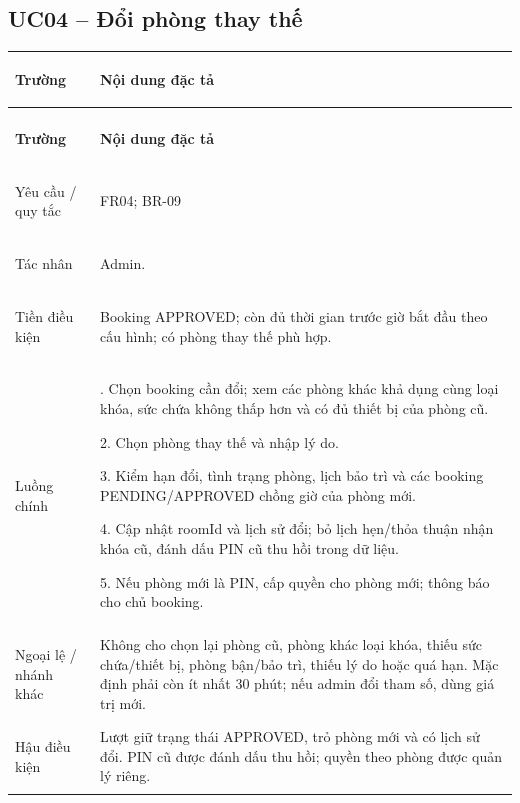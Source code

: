 \subsection{UC04 -- Đổi phòng thay thế}\label{tab:uc04}
{\small\renewcommand{\arraystretch}{1.06}
\setlength{\tabcolsep}{6pt}\setlength{\extrarowheight}{2pt}
\renewcommand{\theHtable}{uc.\arabic{subsection}}\addtocounter{table}{-1}
\begin{longtable}{|>{\bfseries\raggedright\arraybackslash}p{3cm}|>{\raggedright\arraybackslash}p{\dimexpr\textwidth-3cm-4\tabcolsep-3\arrayrulewidth\relax}|}
\hline
\textbf{Trường} & \textbf{Nội dung đặc tả}\\\hline
\endfirsthead
\multicolumn{2}{r}{\small\itshape UC04 (tiếp)}\\
\hline
\textbf{Trường} & \textbf{Nội dung đặc tả}\\\hline
\endhead
\endlastfoot
Yêu cầu / quy tắc & FR04; BR-09\\*\hline
Tác nhân & Admin.\\*\hline
Tiền điều kiện & Booking APPROVED; còn đủ thời gian trước giờ bắt đầu theo cấu hình; có phòng thay thế phù hợp.\\*\hline
Luồng chính & 1. Chọn booking cần đổi; xem các phòng khác khả dụng cùng loại khóa, sức chứa không thấp hơn và có đủ thiết bị của phòng cũ.\par
2. Chọn phòng thay thế và nhập lý do.\par
3. Kiểm hạn đổi, tình trạng phòng, lịch bảo trì và các booking PENDING/APPROVED chồng giờ của phòng mới.\par
4. Cập nhật roomId và lịch sử đổi; bỏ lịch hẹn/thỏa thuận nhận khóa cũ, đánh dấu PIN cũ thu hồi trong dữ liệu.\par
5. Nếu phòng mới là PIN, cấp quyền cho phòng mới; thông báo cho chủ booking.\\\hline
Ngoại lệ / nhánh khác & Không cho chọn lại phòng cũ, phòng khác loại khóa, thiếu sức chứa/thiết bị, phòng bận/bảo trì, thiếu lý do hoặc quá hạn. Mặc định phải còn ít nhất 30 phút; nếu admin đổi tham số, dùng giá trị mới.\\\hline
Hậu điều kiện & Lượt giữ trạng thái APPROVED, trỏ phòng mới và có lịch sử đổi. PIN cũ được đánh dấu thu hồi; quyền theo phòng được quản lý riêng.\\\hline
\end{longtable}}

